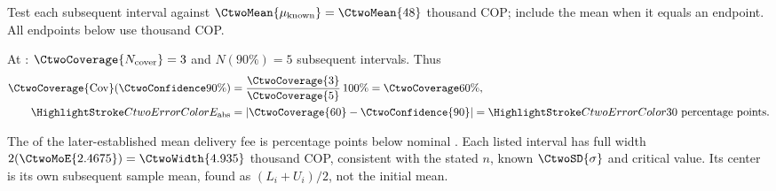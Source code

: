 
Test each subsequent interval against $\CtwoMean{\mu_{\mathrm{known}}}=\CtwoMean{48}$ thousand COP; include the mean when it equals an endpoint. All endpoints below use thousand COP.



At : $\CtwoCoverage{N_{\mathrm{cover}}}=3$ and $N(90\%)=5$ subsequent intervals. Thus
\[\begin{aligned}
\CtwoCoverage{\mathrm{Cov}}(\CtwoConfidence{90\%})&=\frac{\CtwoCoverage{3}}{\CtwoCoverage{5}}\,100\%=\CtwoCoverage{60\%},\\
\CtwoError{E_{\mathrm{abs}}}&=|\CtwoCoverage{60}-\CtwoConfidence{90}|=\CtwoError{30}\text{ percentage points}.
\end{aligned}\]

The  of the later-established mean delivery fee is  percentage points below nominal . Each listed interval has full width $2(\CtwoMoE{2.4675})=\CtwoWidth{4.935}$ thousand COP, consistent with the stated $n$, known $\CtwoSD{\sigma}$ and critical value. Its center is its own subsequent sample mean, found as $(L_i+U_i)/2$, not the initial mean.

